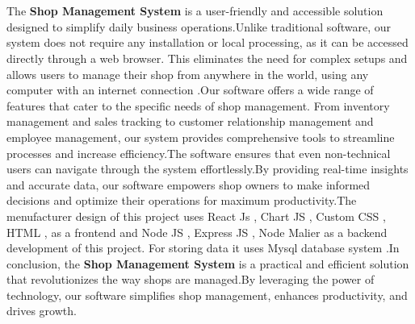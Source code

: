 \section*{}
\vspace{1.5cm}


The \textbf{Shop Management System} is a user-friendly and accessible solution designed to simplify daily business operations.Unlike traditional software, our system does not require any installation or local processing, as it can be accessed directly through a web browser. This eliminates the need for complex setups and allows users to manage their shop from anywhere in the world, using any computer with an internet connection .Our software offers a wide range of features that cater to the specific needs of shop management. From inventory management and sales tracking to customer relationship management and employee management, our system provides comprehensive tools to streamline processes and increase efficiency.The software ensures that even non-technical users can navigate through the system effortlessly.By providing real-time insights and accurate data, our software empowers shop owners to make informed decisions and optimize their operations for maximum productivity.The menufacturer design of this project uses React Js , Chart JS , Custom CSS , HTML , as a frontend and Node JS , Express JS , Node Malier as a backend development of this project. For storing data it uses Mysql database system .In conclusion, the \textbf{Shop Management System} is a practical and efficient solution that revolutionizes the way shops are managed.By leveraging the power of technology, our software simplifies shop management, enhances productivity, and drives growth.


